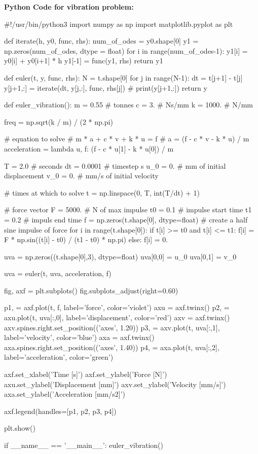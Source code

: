 \documentclass[10pt,b5paper,titlepage]{book}
\begin{document}
\newpage
\textbf{Python Code for vibration problem:}

\begin{python}
#!/usr/bin/python3
import numpy as np
import matplotlib.pyplot as plt


def iterate(h, y0, func, rhs):
    num_of_odes = y0.shape[0]
    y1 = np.zeros(num_of_odes, dtype = float)
    for i in range(num_of_odes-1):
        y1[i] = y0[i] + y0[i+1] * h
    y1[-1] = func(y1, rhs)
    return y1


def euler(t, y, func, rhs):
    N = t.shape[0]
    for j in range(N-1):
        dt = t[j+1] - t[j]
        y[j+1,:] = iterate(dt, y[j,:], func, rhs[j])
        # print(y[j+1,:])
    return y


def euler_vibration():
    m = 0.55  # tonnes
    c = 3.    # Ns/mm
    k = 1000. # N/mm

    freq = np.sqrt(k / m) / (2 * np.pi)

    # equation to solve
    # m * a + c * v + k * u = f
    # a = (f - c * v - k * u) / m
    acceleration = lambda u, f: (f - c * u[1] - k * u[0]) / m

    T = 2.0     # seconds
    dt = 0.0001 # timestep s
    u_0 = 0.    # mm of initial displacement
    v_0 = 0.    # mm/s of initial velocity

    # times at which to solve
    t = np.linspace(0, T, int(T/dt) + 1)

    # force vector
    F = 5000. # N of max impulse
    t0 = 0.1  # impulse start time
    t1 = 0.2  # impuls end time
    f = np.zeros(t.shape[0], dtype=float)
    # create a half sine impulse of force
    for i in range(t.shape[0]):
        if t[i] >= t0 and t[i] <= t1:
            f[i] = F * np.sin((t[i] - t0) / (t1 - t0) * np.pi)
        else:
            f[i] = 0.

    uva = np.zeros((t.shape[0],3), dtype=float)
    uva[0,0] = u_0
    uva[0,1] = v_0

    uva = euler(t, uva, acceleration, f)

    fig, axf = plt.subplots()
    fig.subplots_adjust(right=0.60)

    p1, = axf.plot(t, f, label='force', color='violet')
    axu = axf.twinx()
    p2, = axu.plot(t, uva[:,0], label='displacement', color='red')
    axv = axf.twinx()
    axv.spines.right.set_position(('axes', 1.20))
    p3, = axv.plot(t, uva[:,1], label='velocity', color='blue')
    axa = axf.twinx()
    axa.spines.right.set_position(('axes', 1.40))
    p4, = axa.plot(t, uva[:,2], label='acceleration', color='green')

    axf.set_xlabel('Time [s]')
    axf.set_ylabel('Force [N]')
    axu.set_ylabel('Displacement [mm]')
    axv.set_ylabel('Velocity [mm/s]')
    axa.set_ylabel('Acceleration [mm/s2]')

    axf.legend(handles=[p1, p2, p3, p4])

    plt.show()

if __name__ == '__main__':
    euler_vibration()

\end{python}
\end{document}
